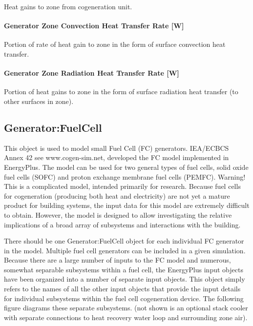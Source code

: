 Heat gains to zone from cogeneration unit.

\paragraph{Generator Zone Convection Heat Transfer Rate {[}W{]}}\label{generator-zone-convection-heat-transfer-rate-w}

Portion of rate of heat gain to zone in the form of surface convection heat transfer.

\paragraph{Generator Zone Radiation Heat Transfer Rate {[}W{]}}\label{generator-zone-radiation-heat-transfer-rate-w}

Portion of heat gains to zone in the form of surface radiation heat transfer (to other surfaces in zone).

\subsection{Generator:FuelCell}\label{generatorfuelcell}

This object is used to model small Fuel Cell (FC) generators. IEA/ECBCS Annex 42 see www.cogen-sim.net, developed the FC model implemented in EnergyPlus. The model can be used for two general types of fuel cells, solid oxide fuel cells (SOFC) and proton exchange membrane fuel cells (PEMFC). Warning! This is a complicated model, intended primarily for research. Because fuel cells for cogeneration (producing both heat and electricity) are not yet a mature product for building systems, the input data for this model are extremely difficult to obtain. However, the model is designed to allow investigating the relative implications of a broad array of subsystems and interactions with the building.

There should be one Generator:FuelCell object for each individual FC generator in the model. Multiple fuel cell generators can be included in a given simulation. Because there are a large number of inputs to the FC model and numerous, somewhat separable subsystems within a fuel cell, the EnergyPlus input objects have been organized into a number of separate input objects. This object simply refers to the names of all the other input objects that provide the input details for individual subsystems within the fuel cell cogeneration device. The following figure diagrams these separate subsystems. (not shown is an optional stack cooler with separate connections to heat recovery water loop and surrounding zone air).

